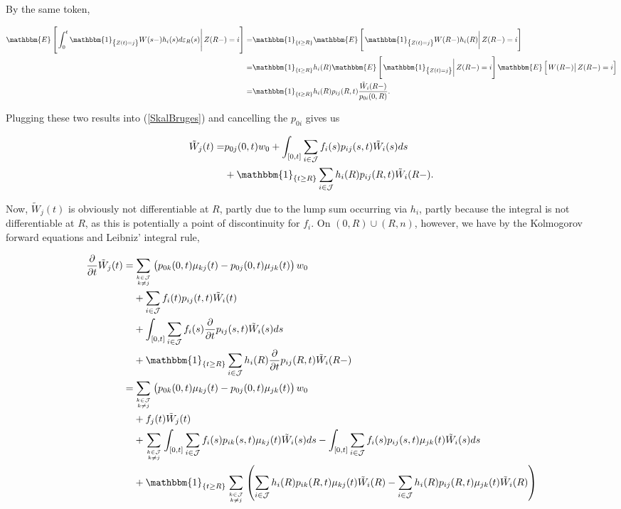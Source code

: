 \documentclass{book}
\newcommand{\1}[1]{\mathbbm{1}_{\left\lbrace #1 \right\rbrace}}
\newcommand{\econd}[2][def]{\mathbbm{E} \left[ \left. #1 \right| #2 \right]}
\theoremstyle{break}
\theoremstyle{remark}
\numberwithin{equation}{section}
\begin{document}
By the same token,

\begin{align*}
	\econd[\int_0^t \1{Z(t)=j} W(s-) h_{i}(s) d \varepsilon_{R}(s)]{Z(R-)=i} =& \1{t \geq R} \econd[\1{Z(t)=j} W(R-) h_{i}(R)]{Z(R-)=i} \\
	=& \1{t \geq R} h_{i}(R) \econd[\1{Z(t)=j}]{Z(R-)=i} \econd[W(R-)]{Z(R-)=i} \\
	=& \1{t \geq R} h_{i}(R) p_{ij}(R,t) \frac{\tilde{W}_i(R-)}{p_{0i}(0,R)}.
\end{align*}

Plugging these two results into (\ref{SkalBruges}) and cancelling the $p_{0i}$ gives us

\begin{align} \label{Brug}
\begin{split}
		\tilde{W}_j(t) =& p_{0j}(0,t) w_0 + \int_{\left[ 0,t \right]} \sum_{i \in \mathcal{J}} f_{i}(s) p_{ij}(s,t) \tilde{W}_i(s) ds \\
	&+ \1{t \geq R} \sum_{i \in \mathcal{J}} h_{i}(R) p_{ij}(R,t) \tilde{W}_i(R-).
\end{split}
\end{align}

Now, $\tilde{W}_j(t)$ is obviously not differentiable at $R$, partly due to the lump sum occurring via $h_i$, partly because the integral is not differentiable at $R$, as this is potentially a point of discontinuity for $f_i$. On $(0,R)\cup(R,n)$, however, we have by the Kolmogorov forward equations and Leibniz' integral rule,

\begin{align*}
	\frac{\partial}{\partial t} \tilde{W}_j(t) =&\sum_{k \in \mathcal{J} \atop k \neq j} \left(p_{0k}(0,t) \mu_{kj}(t) - p_{0j}(0,t) \mu_{jk}(t) \right) w_0 \\
	&+ \sum_{i \in \mathcal{J}} f_i(t) p_{ij}(t,t) \tilde{W}_i(t) \\
	&+ \int_{\left[ 0,t \right]} \sum_{i \in \mathcal{J}} f_{i}(s) \frac{\partial}{\partial t} p_{ij}(s,t) \tilde{W}_i(s) ds \\
	&+ \1{t \geq R} \sum_{i \in \mathcal{J}} h_{i}(R) \frac{\partial}{\partial t} p_{ij}(R,t) \tilde{W}_i(R-) \\
	=& \sum_{k \in \mathcal{J} \atop k \neq j} \left(p_{0k}(0,t) \mu_{kj}(t) - p_{0j}(0,t) \mu_{jk}(t) \right) w_0 \\
	&+ f_j(t) \tilde{W}_j(t) \\
	&+ \sum_{k \in \mathcal{J} \atop k \neq j} \int_{\left[ 0,t \right]} \sum_{i \in \mathcal{J}} f_{i}(s) p_{ik}(s,t) \mu_{kj}(t) \tilde{W}_i(s) ds - \int_{\left[ 0,t \right]} \sum_{i \in \mathcal{J}} f_{i}(s) p_{ij}(s,t) \mu_{jk}(t) \tilde{W}_i(s) ds \\
	&+ \1{t \geq R} \sum_{k \in \mathcal{J} \atop k \neq j} \left( \sum_{i \in \mathcal{J}} h_{i}(R) p_{ik}(R,t) \mu_{kj}(t) \tilde{W}_i(R) - \sum_{i \in \mathcal{J}} h_{i}(R) p_{ij}(R,t) \mu_{jk}(t) \tilde{W}_i(R) \right) \\
\end{align*}
\end{document}
